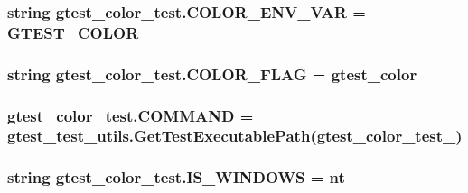 \subsubsection[{\texorpdfstring{C\+O\+L\+O\+R\+\_\+\+E\+N\+V\+\_\+\+V\+AR}{COLOR_ENV_VAR}}]{\setlength{\rightskip}{0pt plus 5cm}string gtest\+\_\+color\+\_\+test.\+C\+O\+L\+O\+R\+\_\+\+E\+N\+V\+\_\+\+V\+AR = \textquotesingle{}G\+T\+E\+S\+T\+\_\+\+C\+O\+L\+OR\textquotesingle{}}\hypertarget{namespacegtest__color__test_aa6deaa7da27bcc115fe666abad13419c}{}\label{namespacegtest__color__test_aa6deaa7da27bcc115fe666abad13419c}
\subsubsection[{\texorpdfstring{C\+O\+L\+O\+R\+\_\+\+F\+L\+AG}{COLOR_FLAG}}]{\setlength{\rightskip}{0pt plus 5cm}string gtest\+\_\+color\+\_\+test.\+C\+O\+L\+O\+R\+\_\+\+F\+L\+AG = \textquotesingle{}gtest\+\_\+color\textquotesingle{}}\hypertarget{namespacegtest__color__test_af5818cea608c0551909fefbeaf0edf20}{}\label{namespacegtest__color__test_af5818cea608c0551909fefbeaf0edf20}
\subsubsection[{\texorpdfstring{C\+O\+M\+M\+A\+ND}{COMMAND}}]{\setlength{\rightskip}{0pt plus 5cm}gtest\+\_\+color\+\_\+test.\+C\+O\+M\+M\+A\+ND = {\bf gtest\+\_\+test\+\_\+utils.\+Get\+Test\+Executable\+Path}(\textquotesingle{}gtest\+\_\+color\+\_\+test\+\_\+\textquotesingle{})}\hypertarget{namespacegtest__color__test_a5b2d1937052a86cc99b722dd0db8e4fc}{}\label{namespacegtest__color__test_a5b2d1937052a86cc99b722dd0db8e4fc}
\subsubsection[{\texorpdfstring{I\+S\+\_\+\+W\+I\+N\+D\+O\+WS}{IS_WINDOWS}}]{\setlength{\rightskip}{0pt plus 5cm}string gtest\+\_\+color\+\_\+test.\+I\+S\+\_\+\+W\+I\+N\+D\+O\+WS = \textquotesingle{}nt\textquotesingle{}}\hypertarget{namespacegtest__color__test_a0d4451a99f88105308f0842eb3ec2938}{}\label{namespacegtest__color__test_a0d4451a99f88105308f0842eb3ec2938}
